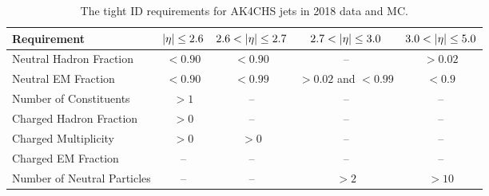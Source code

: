 \begin{table}[H]
    \caption{The tight ID requirements for AK4CHS jets in 2018 data and MC.}
    \begin{center}
        \begin{tabular}{lcccc}\hline\hline
            Requirement                 & $\lvert \eta \rvert \leq 2.6$         & $2.6 < \lvert \eta \rvert \leq 2.7$   & $2.7 < \lvert \eta \rvert \leq 3.0$   & $3.0 < \lvert \eta \rvert \leq 5.0$ \\ \hline
            Neutral Hadron Fraction     & $< 0.90$                  & $< 0.90$                  & --                         & $> 0.02$ \\
            Neutral EM Fraction         & $< 0.90$                  & $< 0.99$                  & $> 0.02$ and $< 0.99$     & $< 0.9$ \\
            Number of Constituents      & $> 1$                     & --                         & --                         & -- \\	
            Charged Hadron Fraction     & $> 0$                     & --                         & --                         & -- \\
            Charged Multiplicity        & $> 0$                     & $> 0$                     & --                         & -- \\
            Charged EM Fraction         & --                         & --                         & --                         & -- \\ 
            Number of Neutral Particles & --                         & --                         & $> 2$                     & $> 10$ \\\hline\hline
        \end{tabular}
        \label{tab:2018jetid}
    \end{center}
\end{table}
